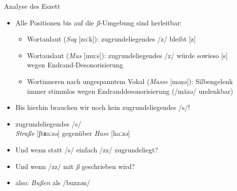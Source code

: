 \begin{frame}
  {Analyse des Eszett}
  \pause
  \begin{itemize}[<+->]
    \item \alert{Alle Positionen bis auf die \textit{ß}-Umgebung sind herleitbar:}
      \begin{itemize}[<+->]
        \item Wortanlaut (\textit{Sog} [zoːk]): zugrundeliegendes /z/ bleibt [z]
        \item Wortauslaut (\textit{Mus} [muːs]): zugrundeliegendes /z/ würde sowieso [s]\\
          wegen Endrand-Desonorisierung
        \item Wortinneren nach ungespanntem Vokal (\textit{Masse} [maṣə]): \alert{Silbengelenk}\\
          immer stimmlos wegen Endranddesonorisierung (/măzə/ undenkbar)
      \end{itemize}
      \Halbzeile
    \item \alert{Bis hierhin brauchen wir noch kein zugrundeliegendes /s/!}
      \Halbzeile
    \item zugrundeliegendes /s/ \\
      \textit{Straße} [ʃtʁaːsə] gegenüber \textit{Hase} [haːzə]
    \item \alert{Und wenn statt /s/ einfach /zz/ zugrundeliegt?}
    \item \alert{Und wenn /zz/ mit \textit{ß} geschrieben wird?}
    \item also: \textit{Bußen} als /buzzən/ \phopro [buːssən]
  \end{itemize}
\end{frame}

